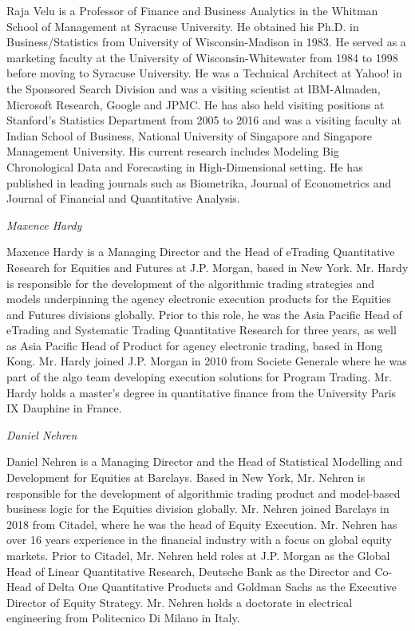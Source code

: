 \noindent Raja Velu is a Professor of Finance and Business Analytics in the Whitman School of Management at Syracuse University. He obtained his Ph.D. in Business/Statistics from University of Wisconsin-Madison in 1983. He served as a marketing faculty at the University of Wisconsin-Whitewater from 1984 to 1998 before moving to Syracuse University. He was a Technical Architect at Yahoo! in the Sponsored Search Division and was a visiting scientist at IBM-Almaden, Microsoft Research, Google and JPMC. He has also held visiting positions at Stanford's Statistics Department from 2005 to 2016 and was a visiting faculty at Indian School of Business, National University of Singapore and Singapore Management University. His current research includes Modeling Big Chronological Data and Forecasting in High-Dimensional setting. He has published in leading journals such as Biometrika, Journal of Econometrics and Journal of Financial and Quantitative Analysis. \bigbreak

{\noindent\large\itshape Maxence Hardy} \medbreak

\noindent Maxence Hardy is a Managing Director and the Head of eTrading Quantitative Research for Equities and Futures at J.P. Morgan, based in New York. Mr. Hardy is responsible for the development of the algorithmic trading strategies and models underpinning the agency electronic execution products for the Equities and Futures divisions globally. Prior to this role, he was the Asia Pacific Head of eTrading and Systematic Trading Quantitative Research for three years, as well as Asia Pacific Head of Product for agency electronic trading, based in Hong Kong. Mr. Hardy joined J.P. Morgan in 2010 from Societe Generale where he was part of the algo team developing execution solutions for Program Trading. Mr. Hardy holds a master's degree in quantitative finance from the University Paris IX Dauphine in France. \bigbreak

{\noindent\large\itshape Daniel Nehren} \medbreak

\noindent Daniel Nehren is a Managing Director and the Head of Statistical Modelling and Development for Equities at Barclays. Based in New York, Mr. Nehren is responsible for the development of algorithmic trading product and model-based business logic for the Equities division globally. Mr. Nehren joined Barclays in 2018 from Citadel, where he was the head of Equity Execution. Mr. Nehren has over 16 years experience in the financial industry with a focus on global equity markets. Prior to Citadel, Mr. Nehren held roles at J.P. Morgan as the Global Head of Linear Quantitative Research, Deutsche Bank as the Director and Co-Head of Delta One Quantitative Products and Goldman Sachs as the Executive Director of Equity Strategy. Mr. Nehren holds a doctorate in electrical engineering from Politecnico Di Milano in Italy.


